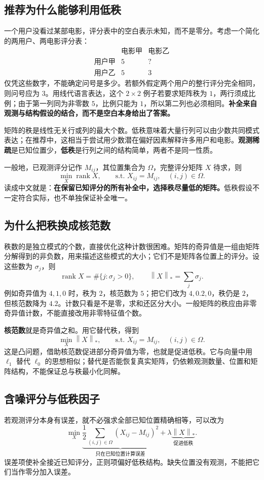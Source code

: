 \documentclass[UTF8,fontset=fandol,a4paper,12pt]{ctexart}
\newcommand{\rank}{\operatorname{rank}}
\newcommand{\norm}[1]{\left\lVert#1\right\rVert}
\theoremstyle{definition}
\begin{document}
\subsection{推荐为什么能够利用低秩}\label{sec:lowrank}
一个用户没看过某部电影，评分表中的空白表示未知，而不是零分。考虑一个简化的两用户、两电影评分表：
\[
 \begin{array}{c|cc}
 &\text{电影甲}&\text{电影乙}\\\hline
 \text{用户甲}&5&?\\
 \text{用户乙}&5&3
 \end{array}
\]
仅凭这些数字，不能确定问号是多少。若额外假定两个用户的整行评分完全相同，则问号应为 $3$。用线代语言表达，这个 $2\times2$ 例子若要求矩阵秩为 $1$，两行须成比例；由于第一列同为非零数 $5$，比例只能为 $1$，所以第二列也必须相同。\textbf{补全来自观测与结构假设的结合，而不是空白本身给出了答案。}

矩阵的秩是线性无关行或列的最大个数。低秩意味着大量行列可以由少数共同模式表达；在推荐中，这相当于尝试用少数潜在偏好因素解释许多用户和电影。\textbf{观测稀疏}是已知位置少，\textbf{低秩}是行列之间的结构简单，两者不是同一性质。

一般地，已观测评分记作 $M_{ij}$，其位置集合为 $\Omega$，完整评分矩阵 $X$ 待求，则
\[
 \boxed{\min_X\rank X,\qquad
 \text{s.t. }X_{ij}=M_{ij},\quad(i,j)\in\Omega.}
\]
读成中文就是：\textbf{在保留已知评分的所有补全中，选择秩尽量低的矩阵。}低秩假设不一定符合实际，也不单独保证补全唯一。

\subsection{为什么把秩换成核范数}
秩数的是独立模式的个数，直接优化这种计数很困难。矩阵的奇异值是一组由矩阵分解得到的非负数，用来描述这些模式的大小；它们不是矩阵各位置上的评分。设这些数为 $\sigma_j$，则
\[
 \rank X=\#\{j:\sigma_j>0\},\qquad
 \norm{X}_*=\sum_j\sigma_j.
\]
例如奇异值为 $4,1,0$ 时，秩为 $2$，核范数为 $5$；把它们改为 $4,0.2,0$，秩仍是 $2$，但核范数降为 $4.2$。计数只看是不是零，求和还区分大小。一般矩阵的秩应由非零奇异值计数，不能直接改用非零特征值个数。

\textbf{核范数}就是奇异值之和。用它替代秩，得到
\[
 \boxed{\min_X\norm{X}_*,\qquad
 \text{s.t. }X_{ij}=M_{ij},\quad(i,j)\in\Omega.}
\]
这是凸问题，借助核范数促进部分奇异值为零，也就是促进低秩。它与向量中用 $\ell_1$ 替代 $\ell_0$ 的思想相似；替代是否能恢复真实矩阵，仍依赖观测数量、位置和矩阵结构，不能保证总与秩最小化同解。

\subsection{含噪评分与低秩因子}
若观测评分本身有误差，就不必强求全部已知位置精确相等，可以改为
\[
 \min_X\underbrace{\frac12\sum_{(i,j)\in\Omega}(X_{ij}-M_{ij})^2}_{\text{只在已知位置计算误差}}
 +\lambda\underbrace{\norm{X}_*}_{\text{促进低秩}}.
\]
误差项使补全接近已知评分，正则项偏好低秩结构。缺失位置没有观测，不能把它们当作零分加入误差。
\end{document}
